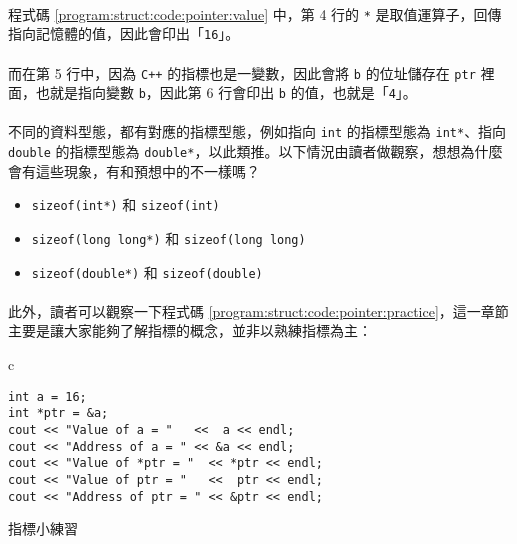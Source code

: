 \documentclass[12pt,a4paper,oneside]{article}
\begin{document}
\begin{CJK}{UTF8}{bkai}
\paragraph{}程式碼 \ref{program:struct:code:pointer:value} 中，第 4 行的 \lstinline!*! 是取值運算子，回傳指向記憶體的值，因此會印出「\lstinline!16!」。

\paragraph{}而在第 5 行中，因為 \texttt{C++} 的指標也是一變數，因此會將 \lstinline!b! 的位址儲存在 \lstinline!ptr! 裡面，也就是指向變數 \lstinline!b!，因此第 6 行會印出 \lstinline!b! 的值，也就是「\lstinline!4!」。

\paragraph{}不同的資料型態，都有對應的指標型態，例如指向 \lstinline!int! 的指標型態為 \lstinline!int*!、指向 \lstinline!double! 的指標型態為 \lstinline!double*!，以此類推。以下情況由讀者做觀察，想想為什麼會有這些現象，有和預想中的不一樣嗎？
\begin{itemize}
\item \lstinline!sizeof(int*)! 和 \lstinline!sizeof(int)!
\item \lstinline!sizeof(long long*)! 和 \lstinline!sizeof(long long)!
\item \lstinline!sizeof(double*)! 和 \lstinline!sizeof(double)!
\end{itemize}

\paragraph{}此外，讀者可以觀察一下程式碼 \ref{program:struct:code:pointer:practice}，這一章節主要是讓大家能夠了解指標的概念，並非以熟練指標為主：
\begin{code}[h!]
  \centering
  \begin{tabular}{c}
  \begin{lstlisting}
int a = 16;
int *ptr = &a;
cout << "Value of a = "   <<  a << endl;
cout << "Address of a = " << &a << endl;
cout << "Value of *ptr = "  << *ptr << endl;
cout << "Value of ptr = "   <<  ptr << endl;
cout << "Address of ptr = " << &ptr << endl;
  \end{lstlisting}
  \end{tabular}
  \caption{指標小練習}
  \label{program:struct:code:pointer:practice}
\end{code}


\end{CJK}
\end{document}
